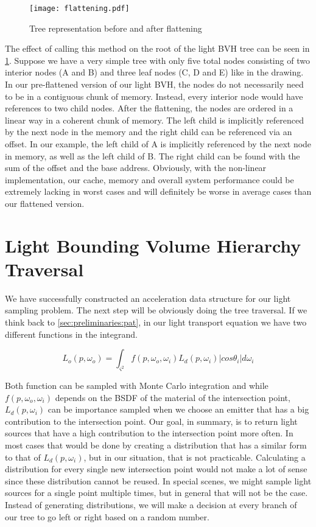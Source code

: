 \begin{figure}
	\begin{center}
		\texttt{[image: flattening.pdf]}
		\caption{Tree representation before and after flattening}
		\label{fig:flattening}
	\end{center}
\end{figure}

The effect of calling this method on the root of the light BVH tree can be seen in \ref{fig:flattening}. Suppose we have a very simple tree with only five total nodes consisting of two interior nodes (A and B) and three leaf nodes (C, D and E) like in the drawing. In our pre-flattened version of our light BVH, the nodes do not necessarily need to be in a contiguous chunk of memory. Instead, every interior node would have references to two child nodes. After the flattening, the nodes are ordered in a linear way in a coherent chunk of memory. The left child is implicitly referenced by the next node in the memory and the right child can be referenced via an offset. In our example, the left child of A is implicitly referenced by the next node in memory, as well as the left child of B. The right child can be found with the sum of the offset and the base address. Obviously, with the non-linear implementation, our cache, memory and overall system performance could be extremely lacking in worst cases and will definitely be worse in average cases than our flattened version.

\section{Light Bounding Volume Hierarchy Traversal}
\label{sec:alg:tra}

We have successfully constructed an acceleration data structure for our light sampling problem. The next step will be obviously doing the tree traversal. If we think back to \ref{sec:preliminaries:pat}, in our light transport equation we have two different functions in the integrand. 

\begin{equation}
L_o(p, \omega_o) = \int_{\varsigma^2}f(p, \omega_o, \omega_i)L_d(p, \omega_i)|cos\theta_i|d\omega_i
\end{equation}

Both function can be sampled with Monte Carlo integration and while $f(p, \omega_o, \omega_i)$ depends on the BSDF of the material of the intersection point, $L_d(p, \omega_i)$ can be importance sampled when we choose an emitter that has a big contribution to the intersection point. Our goal, in summary, is to return light sources that have a high contribution to the intersection point more often. In most cases that would be done by creating a distribution that has a similar form to that of $L_d(p, \omega_i)$, but in our situation, that is not practicable. Calculating a distribution for every single new intersection point would not make a lot of sense since these distribution cannot be reused. In special scenes, we might sample light sources for a single point multiple times, but in general that will not be the case. Instead of generating distributions, we will make a decision at every branch of our tree to go left or right based on a random number.


